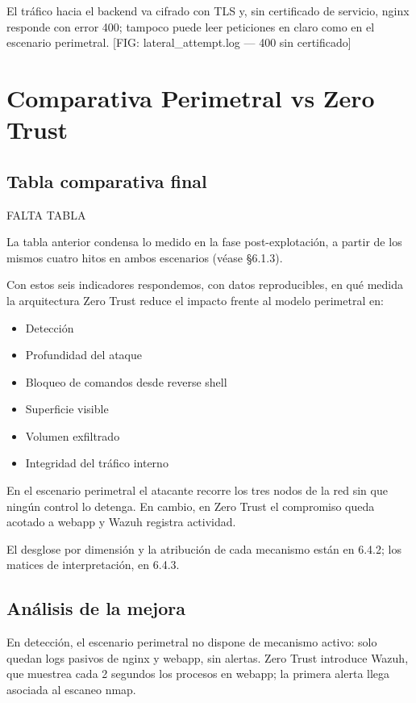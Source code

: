 \documentclass[11pt,spanish,listoffigures,listoftables]{tfgetsinf}
\begin{document}
        El tráfico hacia el backend va cifrado con TLS y, sin certificado de servicio, nginx responde con error 400; tampoco puede leer peticiones en claro como en el escenario perimetral. [FIG: lateral\_attempt.log — 400 sin certificado]

    \section{Comparativa Perimetral vs Zero Trust}
        \subsection{Tabla comparativa final}
        FALTA TABLA

        La tabla anterior condensa lo medido en la fase post-explotación, a partir de los mismos cuatro hitos en ambos escenarios (véase §6.1.3). 

        Con estos seis indicadores respondemos, con datos reproducibles, en qué medida la arquitectura Zero Trust reduce el impacto frente al modelo perimetral en:
        \begin{itemize}
            \item Detección
            \item Profundidad del ataque
            \item Bloqueo de comandos desde reverse shell
            \item Superficie visible
            \item Volumen exfiltrado
            \item Integridad del tráfico interno
        \end{itemize}
        
        En el escenario perimetral el atacante recorre los tres nodos de la red sin que ningún control lo detenga. En cambio, en Zero Trust el compromiso queda acotado a webapp y Wazuh registra actividad. 
        
        El desglose por dimensión y la atribución de cada mecanismo están en 6.4.2; los matices de interpretación, en 6.4.3.
        
        \subsection{Análisis de la mejora}

        En detección, el escenario perimetral no dispone de mecanismo activo: solo quedan logs pasivos de nginx y webapp, sin alertas. Zero Trust introduce Wazuh, que muestrea cada 2 segundos los procesos en webapp; la primera alerta llega asociada al escaneo nmap.
\end{document}
